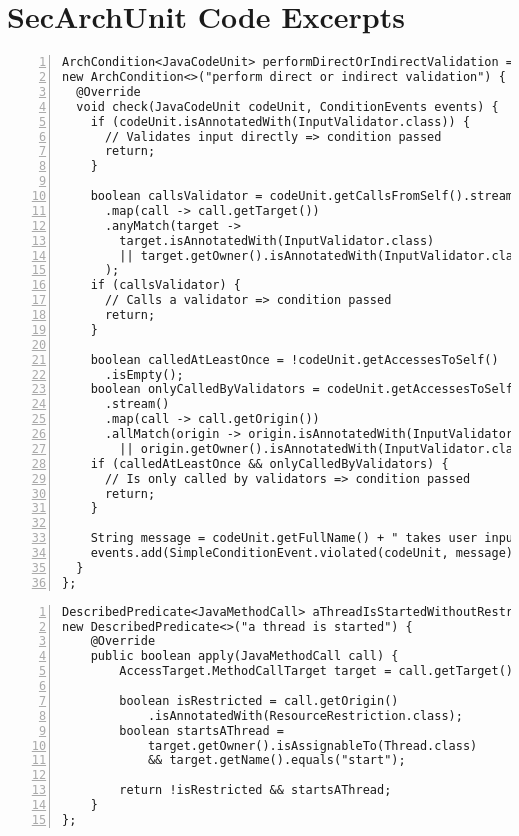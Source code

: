 \chapter{SecArchUnit Code Excerpts}
\begin{lstlisting}[caption=Constraint 4: performDirectOrIndirectValidation custom condition., captionpos=b, label=lst:constraint_4_condition, numbers=left, showstringspaces=false]
ArchCondition<JavaCodeUnit> performDirectOrIndirectValidation =
new ArchCondition<>("perform direct or indirect validation") {
  @Override
  void check(JavaCodeUnit codeUnit, ConditionEvents events) {
    if (codeUnit.isAnnotatedWith(InputValidator.class)) {
      // Validates input directly => condition passed
      return;
    }

    boolean callsValidator = codeUnit.getCallsFromSelf().stream()
      .map(call -> call.getTarget())
      .anyMatch(target -> 
        target.isAnnotatedWith(InputValidator.class)
        || target.getOwner().isAnnotatedWith(InputValidator.class)
      );
    if (callsValidator) {
      // Calls a validator => condition passed
      return;
    }

    boolean calledAtLeastOnce = !codeUnit.getAccessesToSelf()
      .isEmpty();
    boolean onlyCalledByValidators = codeUnit.getAccessesToSelf()
      .stream()
      .map(call -> call.getOrigin())
      .allMatch(origin -> origin.isAnnotatedWith(InputValidator.class)
        || origin.getOwner().isAnnotatedWith(InputValidator.class));
    if (calledAtLeastOnce && onlyCalledByValidators) {
      // Is only called by validators => condition passed
      return;
    }

    String message = codeUnit.getFullName() + " takes user input that is never validated";
    events.add(SimpleConditionEvent.violated(codeUnit, message));
  }
};
\end{lstlisting}

\begin{lstlisting}[caption=Constraint 5: \texttt{aThreadIsStartedWithoutRestriction} custom predicate., captionpos=b, label=lst:constraint_5_predicate_1, numbers=left, showstringspaces=false]
DescribedPredicate<JavaMethodCall> aThreadIsStartedWithoutRestriction =
new DescribedPredicate<>("a thread is started") {
    @Override
    public boolean apply(JavaMethodCall call) {
        AccessTarget.MethodCallTarget target = call.getTarget();

        boolean isRestricted = call.getOrigin()
            .isAnnotatedWith(ResourceRestriction.class);
        boolean startsAThread = 
            target.getOwner().isAssignableTo(Thread.class)
            && target.getName().equals("start");

        return !isRestricted && startsAThread;
    }
};
\end{lstlisting}

